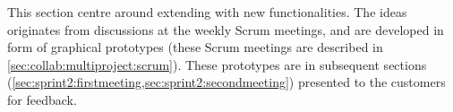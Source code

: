 This section centre around extending \launcher with new functionalities.
The ideas originates from discussions at the weekly Scrum meetings, and are developed in form of graphical prototypes (these Scrum meetings are described in \cref{sec:collab:multiproject:scrum}).
These prototypes are in subsequent sections (\cref{sec:sprint2:firstmeeting,sec:sprint2:secondmeeting}) presented to the customers for feedback.